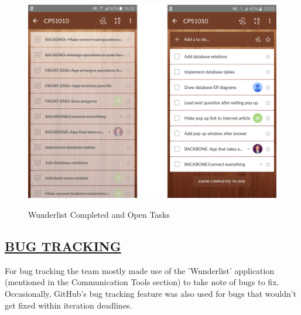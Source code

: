 \documentclass[paper=a4,fontsize=11pt]{article}
\newcommand{\sepspace}{\vspace*{1em}}		%
\newcommand{\SectionPart}[1]{\subsection*{\uppercase{#1}}}
\begin{document}
\begin{figure}[H]
  \caption{Wunderlist Completed and Open Tasks}
  \includegraphics[width=15cm]{Wunderlist/useMe.PNG}\\
  \sepspace
\end{figure}

\sepspace

\SectionPart{\ul{Bug Tracking}}
For bug tracking the team mostly made use of the 'Wunderlist' application (mentioned
in the Communication Tools section) to take note of bugs to fix.
Occasionally, GitHub's bug tracking feature was also used for bugs that wouldn't
get fixed within iteration deadlines.
\end{document}
